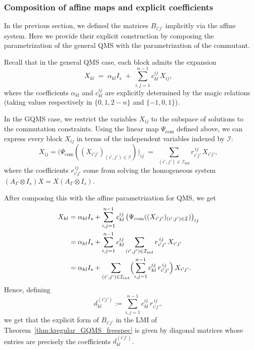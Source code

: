 \documentclass[11pt, a4paper]{article}
\theoremstyle{plain}
\theoremstyle{definition}
\theoremstyle{remark}
\begin{document}
\subsubsection{Composition of affine maps and explicit coefficients}

In the previous section, we defined the matrices \(B_{i'j'}\) implicitly via the affine system. 
Here we provide their explicit construction by composing the parametrization of the general QMS with the parametrization of the commutant.

Recall that in the general QMS case, each block admits the expansion
\[
X_{kl} \;=\; \alpha_{kl} I_s
  \;+\; \sum_{i,j=1}^{n-1} c_{kl}^{ij}\, X_{ij},
\]
where the coefficients \(\alpha_{kl}\) and \(c_{kl}^{ij}\) are explicitly determined by the magic relations (taking values respectively in \(\{ 0, 1, 2-n\}\) and \(\{-1, 0, 1\}\)).

In the GQMS case, we restrict the variables \(X_{ij}\) to the subspace of solutions to the commutation constraints. 
Using the linear map \(\Psi_{\mathrm{com}}\) defined above, we can express every block \(X_{ij}\) in terms of the independent variables indexed by \(\mathcal{I}\):
\[
X_{ij} = \bigl(\Psi_{\mathrm{com}}((X_{i'j'})_{(i',j')\in \mathcal{I}})\bigr)_{ij}
 \;=\; \sum_{(i',j')\in \mathcal{I}_{\mathrm{ind}}} r^{\,ij}_{i'j'}\, X_{i'j'},
\]
where the coefficients \(r^{\,ij}_{i'j'}\) come from solving the homogeneous system \((A_\Gamma \otimes I_s) X = X  ( A_\Gamma \otimes I_s)\).

After composing this with the affine parametrization for QMS, we get
\[
\begin{aligned}
X_{kl}
  &= \alpha_{kl} I_s
   + \sum_{i,j=1}^{n-1}
       c_{kl}^{ij}\,
       \bigl(\Psi_{\mathrm{com}}((X_{i'j'})_{(i',j')\in \mathcal{I}})\bigr)_{ij} \\
  &= \alpha_{kl} I_s
   + \sum_{i,j=1}^{n-1} c_{kl}^{ij}
       \sum_{(i',j')\in \mathcal{I}_{\mathrm{ind}}} r^{\,ij}_{i'j'}\, X_{i'j'} \\
  &= \alpha_{kl} I_s
   + \sum_{(i',j')\in \mathcal{I}_{\mathrm{ind}}}
       \Bigl( \sum_{i,j=1}^{n-1} c_{kl}^{ij}\, r^{\,ij}_{i'j'} \Bigr)\, X_{i'j'}.
\end{aligned}
\]
Hence, defining 
\[
d_{kl}^{(i'j')} := \sum_{i,j=1}^{n-1} c_{kl}^{ij}\, r^{\,ij}_{i'j'},
\]
we get that the explicit form of  \(B_{i'j'}\) in the LMI of Theorem~\ref{thm:kregular_GQMS_freespec} is given by diagonal matrices whose entries are precisely the coefficients \(d_{kl}^{(i'j')}\).
\end{document}
